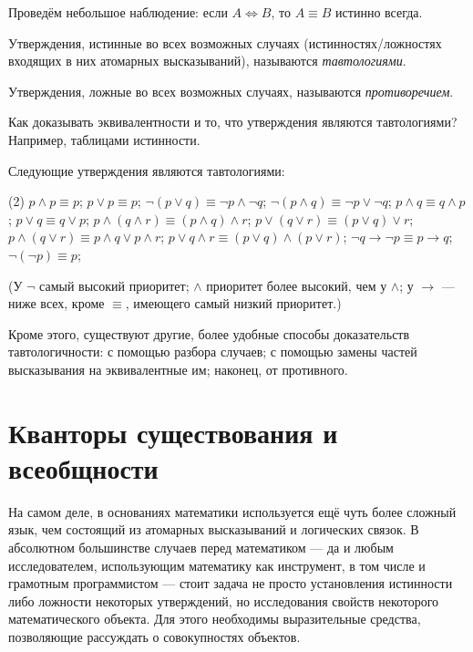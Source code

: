 Проведём небольшое наблюдение: если $A\Leftrightarrow B$, то $A\equiv B$ истинно
всегда.

\begin{defn}
  Утверждения, истинные во всех возможных случаях (истинностях/ложностях
  входящих в них атомарных высказываний), называются \textit{тавтологиями}.
\end{defn}

\begin{defn}
  Утверждения, ложные во всех возможных случаях, называются
  \textit{противоречием}.
\end{defn}

Как доказывать эквивалентности и то, что утверждения являются тавтологиями?
Например, таблицами истинности.

\begin{ex}
  Следующие утверждения являются тавтологиями:
  \begin{tasks}(2)
    \task $p\land p\equiv p$;
    \task $p\lor p\equiv p$;
    \task $\neg(p\lor q)\equiv\neg p\land\neg q$;
    \task $\neg(p\land q)\equiv\neg p\lor\neg q$;
    \task $p\land q\equiv q\land p$;
    \task $p\lor q\equiv q\lor p$;
    \task $p\land(q\land r)\equiv(p\land q)\land r$;
    \task $p\lor(q\lor r)\equiv(p\lor q)\lor r$;
    \task $p\land(q\lor r)\equiv p\land q\lor p\land r$;
    \task $p\lor q\land r\equiv (p\lor q)\land(p\lor r)$;
    \task $\neg q\to\neg p\equiv p\to q$;
    \task $\neg(\neg p)\equiv p$;
  \end{tasks}
  (У $\neg$ самый высокий приоритет; $\land$ приоритет более высокий, чем у
  $\land$; у $\to$ --- ниже всех, кроме $\equiv$, имеющего самый низкий
  приоритет.)
\end{ex}

Кроме этого, существуют другие, более удобные способы доказательств
тавтологичности: с помощью разбора случаев; с помощью замены частей высказывания
на эквивалентные им; наконец, от противного.

\section{Кванторы существования и всеобщности}

На самом деле, в основаниях математики используется ещё чуть более сложный язык,
чем состоящий из атомарных высказываний и логических связок. В абсолютном
большинстве случаев перед математиком --- да и любым исследователем,
использующим математику как инструмент, в том числе и грамотным программистом
--- стоит задача не просто установления истинности либо ложности некоторых
утверждений, но исследования свойств некоторого математического объекта.
Для этого необходимы выразительные средства, позволяющие рассуждать о
совокупностях объектов.

